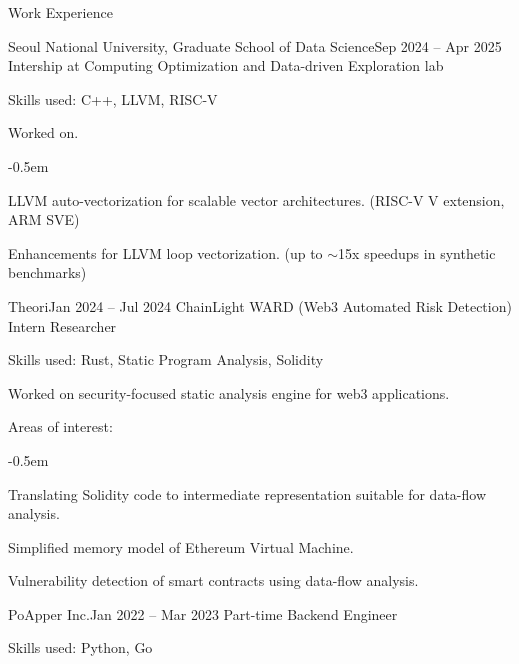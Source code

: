 \documentclass{resume}
\begin{document}
\begin{res-section}{Work Experience}
  \begin{res-subsection}{Seoul National University, Graduate School of Data Science}{Sep 2024 -- Apr 2025}
    Intership at Computing Optimization and Data-driven Exploration lab

    \item Skills used: C++, LLVM, RISC-V
    \item Worked on.
    \vspace{-0.5em}
    \begin{list}{--}{}
      \itemsep -0.5em
      \item LLVM auto-vectorization for scalable vector architectures. (RISC-V V extension, ARM SVE)
      \item Enhancements for LLVM loop vectorization. (up to \(\sim\)15x speedups in synthetic benchmarks)
    \end{list}
  \end{res-subsection}

  \begin{res-subsection}{Theori}{Jan 2024 -- Jul 2024}
    ChainLight WARD (Web3 Automated Risk Detection) Intern Researcher

    \item Skills used: Rust, Static Program Analysis, Solidity

    \item Worked on security-focused static analysis engine for web3 applications.

    \item Areas of interest:
    \vspace{-0.5em}
    \begin{list}{--}{}
      \itemsep -0.5em
      \item Translating Solidity code to intermediate representation suitable for data-flow analysis.
      \item Simplified memory model of Ethereum Virtual Machine.
      \item Vulnerability detection of smart contracts using data-flow analysis.
    \end{list}
  \end{res-subsection}

  \begin{res-subsection}{PoApper Inc.}{Jan 2022 -- Mar 2023}
    Part-time Backend Engineer

    \item Skills used: Python, Go


\end{res-subsection}
\end{res-section}
\end{document}
